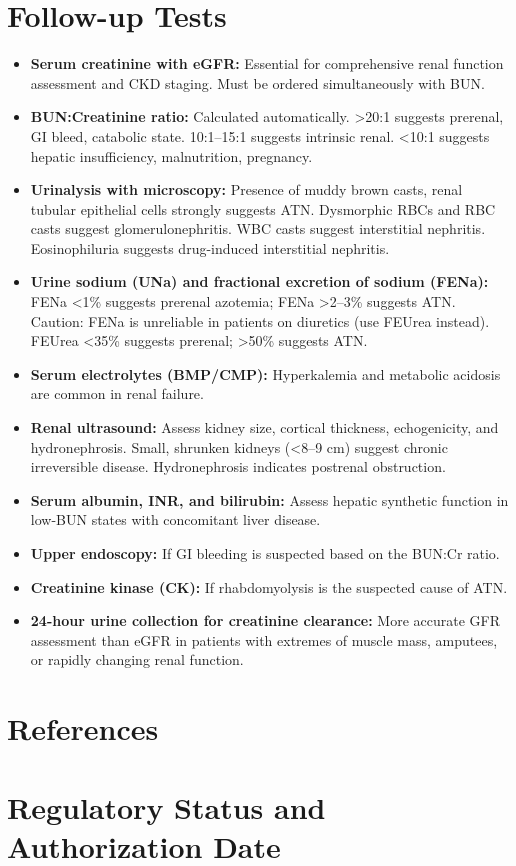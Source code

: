 \section*{Follow-up Tests}
\begin{itemize}
  \item \textbf{Serum creatinine with eGFR:} Essential for comprehensive renal function assessment and CKD staging. Must be ordered simultaneously with BUN.
  \item \textbf{BUN:Creatinine ratio:} Calculated automatically. >20:1 suggests prerenal, GI bleed, catabolic state. 10:1--15:1 suggests intrinsic renal. <10:1 suggests hepatic insufficiency, malnutrition, pregnancy.
  \item \textbf{Urinalysis with microscopy:} Presence of muddy brown casts, renal tubular epithelial cells strongly suggests ATN. Dysmorphic RBCs and RBC casts suggest glomerulonephritis. WBC casts suggest interstitial nephritis. Eosinophiluria suggests drug-induced interstitial nephritis.
  \item \textbf{Urine sodium (UNa) and fractional excretion of sodium (FENa):} FENa <1\% suggests prerenal azotemia; FENa >2--3\% suggests ATN. Caution: FENa is unreliable in patients on diuretics (use FEUrea instead). FEUrea <35\% suggests prerenal; >50\% suggests ATN.
  \item \textbf{Serum electrolytes (BMP/CMP):} Hyperkalemia and metabolic acidosis are common in renal failure.
  \item \textbf{Renal ultrasound:} Assess kidney size, cortical thickness, echogenicity, and hydronephrosis. Small, shrunken kidneys (<8--9 cm) suggest chronic irreversible disease. Hydronephrosis indicates postrenal obstruction.
  \item \textbf{Serum albumin, INR, and bilirubin:} Assess hepatic synthetic function in low-BUN states with concomitant liver disease.
  \item \textbf{Upper endoscopy:} If GI bleeding is suspected based on the BUN:Cr ratio.
  \item \textbf{Creatinine kinase (CK):} If rhabdomyolysis is the suspected cause of ATN.
  \item \textbf{24-hour urine collection for creatinine clearance:} More accurate GFR assessment than eGFR in patients with extremes of muscle mass, amputees, or rapidly changing renal function.
\end{itemize}

\section*{References}



\clearpage
\section*{Regulatory Status and Authorization Date}

\clearpage
